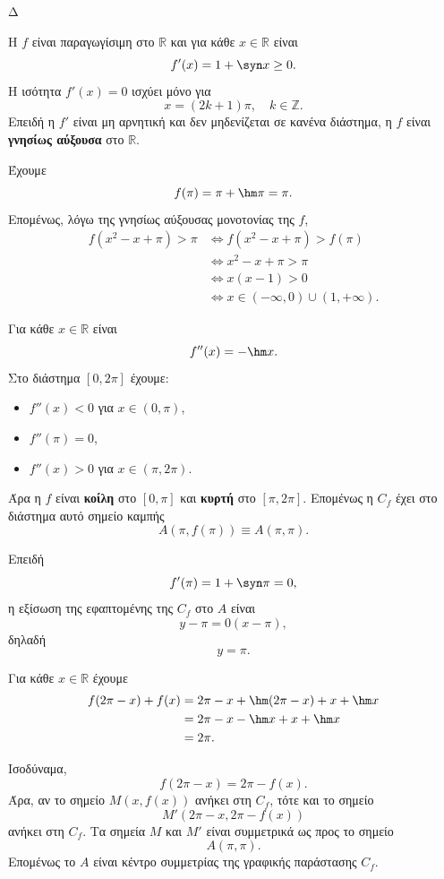 \begin{thema}{Δ}
\begin{erwthma}
\item Η $f$ είναι παραγωγίσιμη στο $\mathbb{R}$ και για κάθε $x\in\mathbb{R}$ είναι
\[
f'(x)=1+\syn x\geq0.
\]
Η ισότητα $f'(x)=0$ ισχύει μόνο για
\[
x=(2k+1)\pi,\quad k\in\mathbb{Z}.
\]
Επειδή η $f'$ είναι μη αρνητική και δεν μηδενίζεται σε κανένα διάστημα, η $f$ είναι \textbf{γνησίως αύξουσα} στο $\mathbb{R}$.

Έχουμε
\[
f(\pi)=\pi+\hm\pi=\pi.
\]
Επομένως, λόγω της γνησίως αύξουσας μονοτονίας της $f$,
\begin{align*}
f(x^2-x+\pi)>\pi
&\Leftrightarrow
f(x^2-x+\pi)>f(\pi)\\
&\Leftrightarrow
x^2-x+\pi>\pi\\
&\Leftrightarrow
x(x-1)>0\\
&\Leftrightarrow
{x\in(-\infty,0)\cup(1,+\infty)}.
\end{align*}

\item Για κάθε $x\in\mathbb{R}$ είναι
\[
f''(x)=-\hm x.
\]
Στο διάστημα $[0,2\pi]$ έχουμε:
\begin{itemize}
\item $f''(x)<0$ για $x\in(0,\pi)$,
\item $f''(\pi)=0$,
\item $f''(x)>0$ για $x\in(\pi,2\pi)$.
\end{itemize}
Άρα η $f$ είναι \textbf{κοίλη} στο $[0,\pi]$ και \textbf{κυρτή} στο $[\pi,2\pi]$. Επομένως η $C_f$ έχει στο διάστημα αυτό σημείο καμπής
\[
{A(\pi,f(\pi))\equiv A(\pi,\pi)}.
\]

Επειδή
\[
f'(\pi)=1+\syn\pi=0,
\]
η εξίσωση της εφαπτομένης της $C_f$ στο $A$ είναι
\[
y-\pi=0(x-\pi),
\]
δηλαδή
\[
{y=\pi}.
\]

\item Για κάθε $x\in\mathbb{R}$ έχουμε
\begin{align*}
f(2\pi-x)+f(x)
&=2\pi-x+\hm(2\pi-x)+x+\hm x\\
&=2\pi-x-\hm x+x+\hm x\\
&={2\pi}.
\end{align*}

Ισοδύναμα,
\[
f(2\pi-x)=2\pi-f(x).
\]
Άρα, αν το σημείο $M(x,f(x))$ ανήκει στη $C_f$, τότε και το σημείο
\[
M'(2\pi-x,2\pi-f(x))
\]
ανήκει στη $C_f$. Τα σημεία $M$ και $M'$ είναι συμμετρικά ως προς το σημείο
\[
{A(\pi,\pi)}.
\]
Επομένως το $A$ είναι κέντρο συμμετρίας της γραφικής παράστασης $C_f$.


\end{erwthma}
\end{thema}
